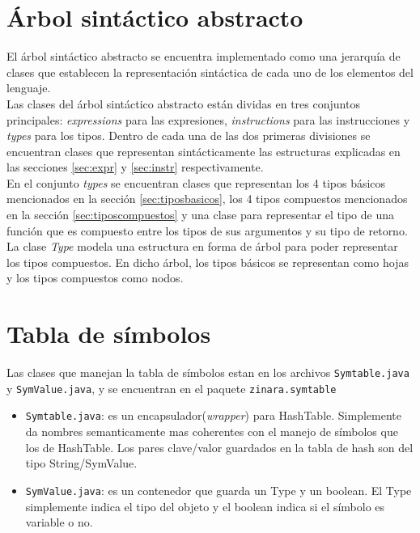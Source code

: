 \documentclass[12pt, spanish]{report}
\begin{document}
\section{\'Arbol sint\'actico abstracto}
\label{sec:ast}

El \'arbol sint\'actico abstracto se encuentra implementado como una
jerarqu\'ia de clases que establecen la representaci\'on sint\'actica de
cada uno de los elementos del lenguaje.\\

Las clases del \'arbol sint\'actico abstracto est\'an dividas en tres
conjuntos principales: \emph{expressions} para las expresiones,
\emph{instructions} para las instrucciones y \emph{types} para los
tipos. Dentro de cada una de las dos primeras divisiones se encuentran
clases que representan sint\'acticamente las estructuras explicadas en
las secciones \ref{sec:expr} y \ref{sec:instr} respectivamente.\\

En el conjunto \emph{types} se encuentran clases que representan los 4
tipos b\'asicos mencionados en la secci\'on \ref{sec:tiposbasicos}, los 4
tipos compuestos mencionados en la secci\'on \ref{sec:tiposcompuestos} y una
clase para representar el tipo de una funci\'on que es compuesto entre
los tipos de sus argumentos y su tipo de retorno.\\

La clase \emph{Type} modela una estructura en forma de \'arbol para
poder representar los tipos compuestos. En dicho \'arbol, los tipos
b\'asicos se representan como hojas y los tipos compuestos como nodos.

\section{Tabla de s\'imbolos}
\label{sec:st}

Las clases que manejan la tabla de s\'imbolos estan en los archivos
\texttt{Symtable.java} y \texttt{SymValue.java}, y se encuentran en el paquete
\texttt{zinara.symtable}

\begin{itemize}
\item \texttt{Symtable.java}: es un encapsulador(\emph{wrapper}) para
  HashTable. Simplemente da nombres semanticamente mas coherentes con
  el manejo de s\'imbolos que los de HashTable. Los pares clave/valor
  guardados en la tabla de hash son del tipo String/SymValue.

\item \texttt{SymValue.java}: es un contenedor que guarda un Type y un
  boolean. El Type simplemente indica el tipo del objeto y el boolean
  indica si el s\'imbolo es variable o no.
\end{itemize}
\end{document}
